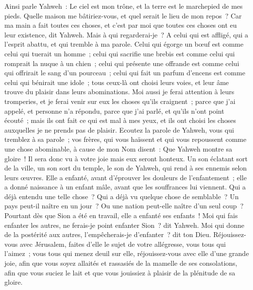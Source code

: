 \begin{multicols}{2}
\VerseOne{}Ainsi parle Yahweh~: Le ciel est mon trône, et la terre est le marchepied de mes pieds. Quelle maison me bâtiriez-vous, et quel serait le lieu de mon repos~?
Car ma main a fait toutes ces choses, et c'est par moi que toutes ces choses ont eu leur existence, dit Yahweh. Mais à qui regarderai-je~? A celui qui est affligé, qui a l'esprit abattu, et qui tremble à ma parole.
Celui qui égorge un bœuf est comme celui qui tuerait un homme~; celui qui sacrifie une brebis est comme celui qui romprait la nuque à un chien~; celui qui présente une offrande est comme celui qui offrirait le sang d'un pourceau~; celui qui fait un parfum d'encens est comme celui qui bénirait une idole~; tous ceux-là ont choisi leurs voies, et leur âme trouve du plaisir dans leurs abominations.
Moi aussi je ferai attention à leurs tromperies, et je ferai venir sur eux les choses qu'ils craignent~; parce que j'ai appelé, et personne n'a répondu, parce que j'ai parlé, et qu'ils n'ont point écouté~; mais ils ont fait ce qui est mal à mes yeux, et ils ont choisi les choses auxquelles je ne prends pas de plaisir.
Ecoutez la parole de Yahweh, vous qui tremblez à sa parole~; vos frères, qui vous haïssent et qui vous repoussent comme une chose abominable, à cause de mon Nom disent~: Que Yahweh montre sa gloire~! Il sera donc vu à votre joie mais eux seront honteux.
Un son éclatant sort de la ville, un son sort du temple, le son de Yahweh, qui rend à ses ennemis selon leurs œuvres.
Elle a enfanté, avant d'éprouver les douleurs de l'enfantement~; elle a donné naissance à un enfant mâle, avant que les souffrances lui viennent.
Qui a déjà entendu une telle chose~? Qui a déjà vu quelque chose de semblable~? Un pays peut-il naître en un jour~? Ou une nation peut-elle naître d'un seul coup~? Pourtant dès que Sion a été en travail, elle a enfanté ses enfants~!
Moi qui fais enfanter les autres, ne ferais-je point enfanter Sion~? dit Yahweh. Moi qui donne de la postérité aux autres, l'empêcherais-je d'enfanter~? dit ton Dieu.
Réjouissez-vous avec Jérusalem, faites d'elle le sujet de votre allégresse, vous tous qui l'aimez~; vous tous qui menez deuil sur elle, réjouissez-vous avec elle d'une grande joie,
afin que vous soyez allaités et rassasiés de la mamelle de ses consolations, afin que vous suciez le lait et que vous jouissiez à plaisir de la plénitude de sa gloire.

\end{multicols}
